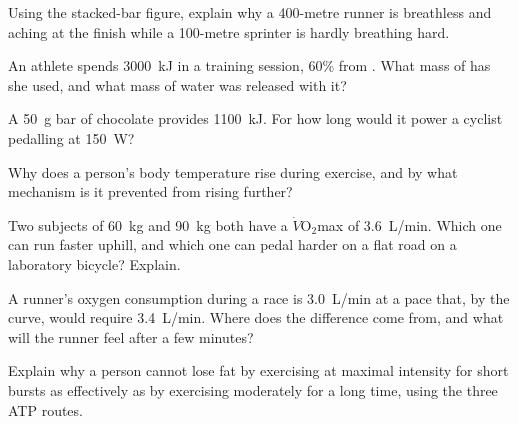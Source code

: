 \begin{exercise}[$\star\star$]\label{exo:g10:exercise-and-energy:8}
Using the stacked-bar figure, explain why a 400-metre runner is
breathless and aching at the finish while a 100-metre sprinter is
hardly breathing hard.
\end{exercise}

\begin{exercise}[$\star\star$]\label{exo:g10:exercise-and-energy:9}
An athlete spends \qty{3000}{kJ} in a training session, 60\% from
. What mass of  has she used, and what mass of
water was released with it?
\end{exercise}

\begin{exercise}[$\star\star$]\label{exo:g10:exercise-and-energy:10}
A \qty{50}{g} bar of chocolate provides \qty{1100}{kJ}. For how long
would it power a cyclist pedalling at \qty{150}{W}?
\end{exercise}

\begin{exercise}[$\star\star$]\label{exo:g10:exercise-and-energy:11}
Why does a person's body temperature rise during exercise, and by
what mechanism is it prevented from rising further?
\end{exercise}

\begin{exercise}[$\star\star\star$]\label{exo:g10:exercise-and-energy:12}
Two subjects of \qty{60}{kg} and \qty{90}{kg} both have a
$\dot V\!\mathrm{O_2}$max of \qty{3.6}{L/min}. Which one can run
faster uphill, and which one can pedal harder on a flat road on a
laboratory bicycle? Explain.
\end{exercise}

\begin{exercise}[$\star\star\star$]\label{exo:g10:exercise-and-energy:13}
A runner's oxygen consumption during a race is \qty{3.0}{L/min} at a
pace that, by the curve, would require \qty{3.4}{L/min}. Where does
the difference come from, and what will the runner feel after a few
minutes?
\end{exercise}

\begin{exercise}[$\star\star\star$]\label{exo:g10:exercise-and-energy:14}
Explain why a person cannot lose fat by exercising at maximal
intensity for short bursts as effectively as by exercising moderately
for a long time, using the three ATP routes.
\end{exercise}

